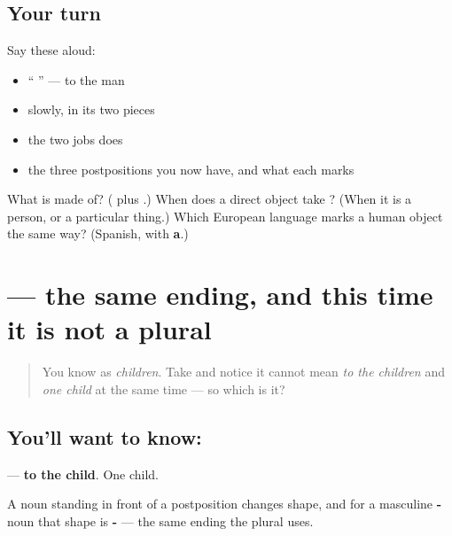 \subsection*{Your turn}
Say these aloud:

\begin{itemize}
\raggedright
  \item \textquotedblleft{} \textquotedblright{} — to the man
  \item \textbf{} slowly, in its two pieces
  \item the two jobs \textbf{} does
  \item the three postpositions you now have, and what each marks
\end{itemize}

\begin{tcolorbox}[breakable,colback=teal!4,colframe=teal!35!black,title={Before you move on}]
What is \textbf{} made of? (\textbf{} plus \textbf{}.) When does a direct object take \textbf{}? (When it is a person, or a particular thing.) Which European language marks a human object the same way? (Spanish, with \textbf{a}.)
\end{tcolorbox}
\section[\texorpdfstring{\hi{बच्चे} \hi{को} (bacce ko)}{बच्चे को (bacce ko)}]{  — the same ending, and this time it is not a plural}

\label{lesson:HI-C91-bacche-ko}



\begin{quote}
You know \textbf{} as \emph{children}. Take \textbf{ } and notice it cannot mean \emph{to the children} and \emph{one child} at the same time — so which is it?
\end{quote}

\subsection*{You'll want to know:  }
\textbf{ } — \textbf{to the child}. One child.

A noun standing in front of a postposition changes shape, and for a masculine \textbf{-} noun that shape is \textbf{-} — the same ending the plural uses.

